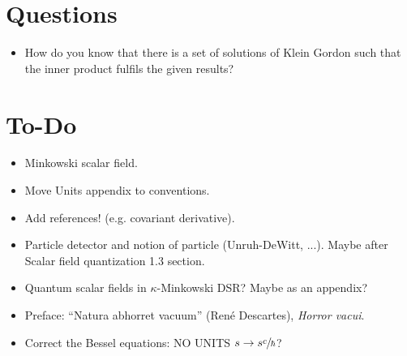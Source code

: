 \section{Questions}
\begin{itemize}
	\item How do you know that there is a set of solutions of Klein Gordon such that the inner product fulfils the given results?
\end{itemize}
\section{To-Do}
\begin{itemize}
	\item Minkowski scalar field.
	\item Move Units appendix to conventions.
	\item Add references! (e.g. covariant derivative).
	\item Particle detector and notion of particle (Unruh-DeWitt, ...). Maybe after Scalar field quantization 1.3 section.
	\item Quantum scalar fields in $\kappa$-Minkowski DSR? Maybe as an appendix? 
	\item Preface:	“Natura abhorret vacuum” (René Descartes), \textit{Horror vacui}.
	\item Correct the Bessel equations: NO UNITS $s\to s\sfrac{c}{\hbar}$?
\end{itemize}